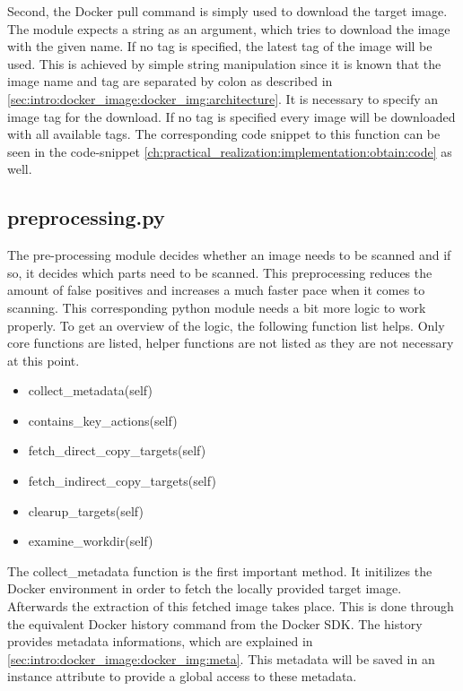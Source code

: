 Second, the Docker pull command is simply used to download the target image. The module expects a string as an argument, which tries to download the image with the given name.
If no tag is specified, the latest tag of the image will be used. This is achieved by simple string manipulation since it is known that the image name and tag are separated by colon as described in \ref{sec:intro:docker_image:docker_img:architecture}.
It is necessary to specify an image tag for the download. If no tag is specified every image will be downloaded with all available tags. The corresponding code snippet to this function can be seen in the code-snippet \ref{ch:practical_realization:implementation:obtain:code} as well.


\subsection{preprocessing.py}
\label{ch:practical_realization:implementation:preprocessing}
The pre-processing module decides whether an image needs to be scanned and if so, it decides which parts need to be scanned. This preprocessing reduces the amount of false positives and increases a much faster pace when it comes to scanning.
This corresponding python module needs a bit more logic to work properly. To get an overview of the logic, the following function list helps. Only core functions are listed, helper functions are not listed as they are not necessary at this point.
\begin{itemize}
\item collect\_metadata(self)
\item contains\_key\_actions(self)
\item fetch\_direct\_copy\_targets(self)
\item fetch\_indirect\_copy\_targets(self)
\item clearup\_targets(self)
\item examine\_workdir(self)
\end{itemize}

The collect\_metadata function is the first important method. It initilizes the Docker environment in order to fetch the locally provided target image. Afterwards the extraction of this fetched image takes place. This is done through the equivalent Docker history command from the Docker SDK. The history provides metadata informations, which are explained in \ref{sec:intro:docker_image:docker_img:meta}. This metadata will be saved in an instance attribute to provide a global access to these metadata.

